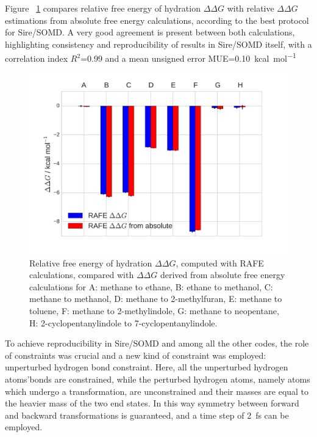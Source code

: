 \documentclass[journal=jctcce,manuscript=article]{achemso}
\begin{document}
Figure ~\ref{fig:sire_histogram} compares relative free energy of hydration 
$\Delta\Delta G$ with relative $\Delta\Delta G$ estimations from absolute free 
energy calculations, according to the best protocol for Sire/SOMD.
A very good agreement is present between both calculations, highlighting 
consistency and reproducibility of results in Sire/SOMD itself, with a 
correlation index $R^2$=\SI{0.99}{} and a mean unsigned error 
MUE=\SI{0.10}{kcal.mol^{-1}}
\begin{figure}[ht]
  \includegraphics[width=\textwidth]{figures/sire_histogram.pdf}
  \caption{Relative free energy of hydration $\Delta\Delta G$, computed with 
  RAFE calculations, compared with $\Delta\Delta G$ derived from absolute free 
  energy calculations for A: methane to ethane, B: ethane to methanol, C: 
  methane to methanol, D: methane to 2-methylfuran, E: methane to toluene,
    F: methane to 2-methylindole, G: methane to neopentane, H: 
    2-cyclopentanylindole to 7-cyclopentanylindole.}
  \label{fig:sire_histogram}
\end{figure}


To achieve reproducibility in Sire/SOMD and among all the other codes, the role 
of constraints was crucial and a new kind of constraint was employed: 
unperturbed hydrogen bond constraint. Here, all the unperturbed hydrogen 
atoms'bonds are constrained, while the perturbed hydrogen atoms, namely atoms 
which undergo a transformation, are unconstrained and their masses are
equal to the heavier mass of the two end states. In this way symmetry between 
forward and backward transformations is guaranteed, and a time step of 
\SI{2}{fs} can be employed.
\end{document}
